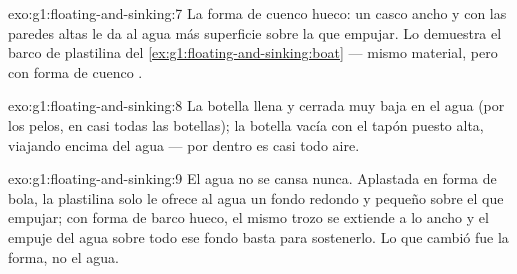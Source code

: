 \begin{solution}{exo:g1:floating-and-sinking:7}
La forma de cuenco hueco: un casco ancho y con las paredes altas le da
al agua más superficie sobre la que empujar. Lo demuestra el barco de
plastilina del \cref{ex:g1:floating-and-sinking:boat} --- mismo
material, pero con forma de cuenco .
\end{solution}

\begin{solution}{exo:g1:floating-and-sinking:8}
La botella llena y cerrada  muy baja en el agua (por los pelos,
en casi todas las botellas); la botella vacía con el tapón puesto
 alta, viajando encima del agua --- por dentro es casi todo
aire.
\end{solution}

\begin{solution}{exo:g1:floating-and-sinking:9}
El agua no se cansa nunca. Aplastada en forma de bola, la plastilina
solo le ofrece al agua un fondo redondo y pequeño sobre el que
empujar; con forma de barco hueco, el mismo trozo se extiende a lo
ancho y el empuje del agua sobre todo ese fondo basta para
sostenerlo. Lo que cambió fue la forma, no el agua.
\end{solution}

